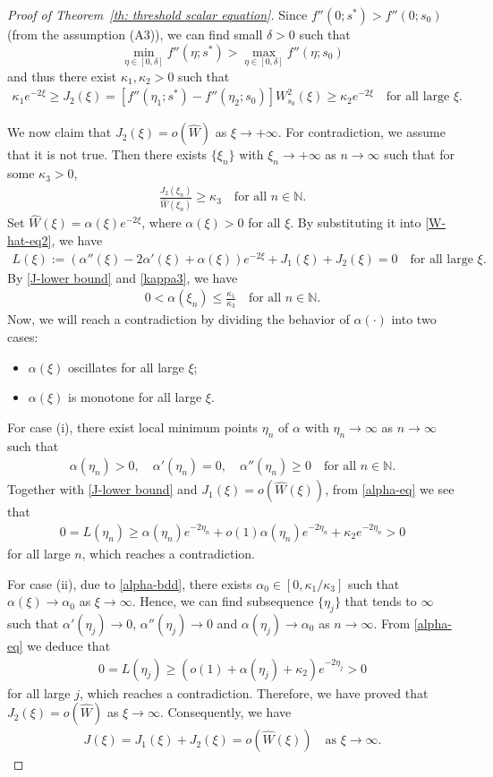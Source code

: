\documentclass[11pt,a4paper]{article}
\numberwithin{equation}{section}
\numberwithin{figure}{section}
\newcommand\bea{\begin{eqnarray}}
\newcommand\eea{\end{eqnarray}}
\newcommand\beaa{\begin{eqnarray*}}
\newcommand\eeaa{\end{eqnarray*}}
\begin{document}
\begin{proof}[Proof of Theorem~\ref{th: threshold scalar equation}]
Since $f''(0;s^*)>f''(0;s_0)$ (from the assumption (A3)), we can find small $\delta>0$ such that
$$\min_{\eta\in[0,\delta]}f''(\eta;s^*)>\max_{\eta\in[0,\delta]}f''(\eta;s_0)$$
and thus
there exist $\kappa_1,\kappa_2>0$ such that
\bea\label{J-lower bound}
\kappa_1e^{-2\xi}\ge J_2(\xi)=[f''(\eta_1;s^*)-f''(\eta_2;s_0)]W^2_{s_0}(\xi)\ge \kappa_2 e^{-2\xi}\quad \mbox{for all large $\xi$}.
\eea


We now claim that $J_2(\xi)=o(\widehat{W})$ as $\xi\to+\infty$.
For contradiction, we assume that it is not true. Then there exists $\{\xi_n\}$ with
$\xi_n\to+\infty$ as $n\to\infty$ such that for some $\kappa_3>0$,
\bea\label{kappa3}
\frac{J_2(\xi_n)}{\widehat{W}(\xi_n)}\geq \kappa_3\quad \mbox{for all $n\in\mathbb{N}$.}
\eea
Set $\widehat{W}(\xi)=\alpha(\xi)e^{-2\xi}$, where $\alpha(\xi)>0$ for all $\xi$.
By substituting it into \eqref{W-hat-eq2},
we have 
\bea\label{alpha-eq}
L(\xi):=(\alpha''(\xi)-2\alpha'(\xi)+\alpha(\xi))e^{-2\xi}+J_1(\xi)+J_2(\xi)=0\quad \mbox{for all large $\xi$}.
\eea
By \eqref{J-lower bound} and \eqref{kappa3}, we have 
\bea\label{alpha-bdd}
0<\alpha(\xi_n)\leq \frac{\kappa_1}{\kappa_3}\quad  \mbox{for all $n\in\mathbb{N}$.}
\eea
Now, we will reach a contradiction by dividing the behavior of $\alpha(\cdot)$ into two cases:
\begin{itemize}
    \item[(i)] $\alpha(\xi)$ oscillates for all large $\xi$;
    \item[(ii)] $\alpha(\xi)$ is monotone for all large $\xi$.
\end{itemize}
For case (i), there exist local minimum points $\eta_n$ of $\alpha$ with $\eta_n\to\infty$ as $n\to\infty$ such that
\beaa
\alpha(\eta_n)>0,\quad \alpha'(\eta_n)=0,\quad \alpha''(\eta_n)\geq 0\quad  \mbox{for all $n\in\mathbb{N}$.}
\eeaa
Together with \eqref{J-lower bound} and $J_1(\xi)=o(\hat W(\xi))$,
from \eqref{alpha-eq} we see that
\beaa
0=L(\eta_n)\geq \alpha(\eta_n)e^{-2\eta_n}+o(1)\alpha(\eta_n)e^{-2\eta_n}+\kappa_2e^{-2\eta_n}>0
\eeaa
for all large $n$, which reaches a contradiction. 

For case (ii),
due to \eqref{alpha-bdd}, there exists $\alpha_0\in[0, \kappa_1/\kappa_3]$
such that $\alpha(\xi)\to \alpha_0$ as $\xi\to\infty$. Hence, we can find subsequence $\{\eta_j\}$ that tends to $\infty$ such that $\alpha'(\eta_j)\to0$, $\alpha''(\eta_j)\to0$ and
$\alpha(\eta_j)\to \alpha_0$ as $n\to\infty$.
From \eqref{alpha-eq} we deduce that
\beaa
0=L(\eta_j)\geq (o(1)+\alpha(\eta_j)+ \kappa_2)e^{-2\eta_j}>0
\eeaa
for all large $j$, which reaches a contradiction. 
Therefore, we have proved that
$J_2(\xi)=o(\widehat{W})$ as $\xi\to\infty$.
Consequently, we have
\bea\label{J-small o}
J(\xi)=J_1(\xi)+J_2(\xi)=o(\widehat{W}(\xi))\quad \mbox{as $\xi\to\infty$.}
\eea



\end{proof}
\end{document}
